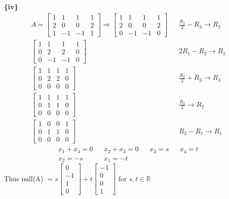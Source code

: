 \documentclass{article}
\begin{document}
\textbf{\{iv\}}
\begin{align*} A =
    \begin{bmatrix}
        1 & 1 & 1 & 1 \\
        2 & 0 & 0 & 2 \\
        1 & -1 & -1 & 1
    \end{bmatrix} \Rightarrow
    \begin{bmatrix}
        1 & 1 & 1 & 1 \\
        2 & 0 & 0 & 2 \\
        0 & -1 & -1 & 0
    \end{bmatrix} && \frac{R_2}{2} - R_3 \xrightarrow{} R_3 \\
    \begin{bmatrix}
        1 & 1 & 1 & 1 \\
        0 & 2 & 2 & 0 \\
        0 & -1 & -1 & 0
    \end{bmatrix} && 2R_1 - R_2 \xrightarrow{} R_2 \\
    \begin{bmatrix}
        1 & 1 & 1 & 1 \\
        0 & 2 & 2 & 0 \\
        0 & 0 & 0 & 0
    \end{bmatrix} 
    && \frac{R_2}{2} + R_3 \xrightarrow{} R_3 \\
    \begin{bmatrix}
        1 & 1 & 1 & 1 \\
        0 & 1 & 1 & 0 \\
        0 & 0 & 0 & 0
    \end{bmatrix} 
    && \frac{R_2}{2} \xrightarrow{} R_2 \\
    \begin{bmatrix}
        1 & 0 & 0 & 1 \\
        0 & 1 & 1 & 0 \\
        0 & 0 & 0 & 0
    \end{bmatrix}
    && R_2 - R_1 \xrightarrow{} R_1
\end{align*}
\begin{align*}
    x_1 + x_4 = 0 && x_2 + x_3 = 0 && x_3 = s && x_4 = t \\
    x_2 = -s && x_1 = -t
\end{align*} Thus null(A) $ = s\begin{bmatrix} 0 \\ -1 \\ 1 \\ 0\end{bmatrix} + t\begin{bmatrix} -1 \\ 0 \\ 0 \\ 1\end{bmatrix} $   for $s,t \in \mathbb{R}$ \newline
\end{document}
